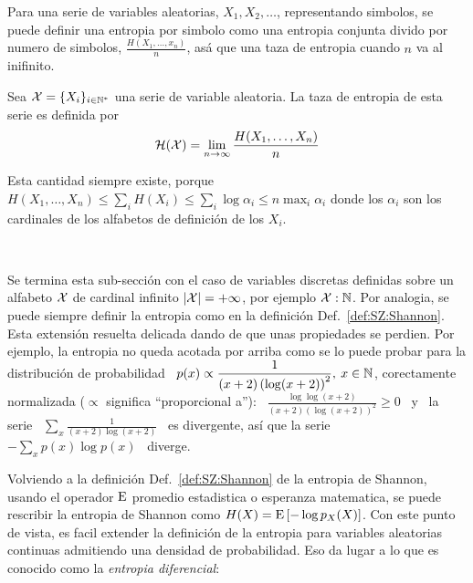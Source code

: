 Para  una  serie de  variables  aleatorias,  $X_1,  X_2, \ldots$,  representando
simbolos, se puede  definir una entropia por simbolo  como una entropia conjunta
divido por numero de simbolos, $\frac{H(X_1,\ldots,x_n)}{n}$, as\'a que una taza
de entropia cuando $n$ va al inifinito.
%
\begin{definicion}\label{def:SZ:TazaDeEntropia}
  Sea $\mathcal{X} = \{  X_i \}_{i \in \mathbb{N}^*}$ una  serie de variable aleatoria.  La taza de
  entropia de esta serie es definida por
  \[
  \mathcal{H}(\mathcal{X}) = \lim_{n \to \infty} \frac{H(X_1,\ldots,X_n)}{n}
  \]
\end{definicion}
%
\noindent Esta cantidad siempre existe, porque $H(X_1 , \ldots , X_n) \le \sum_i
H(X_i) \le \sum_i \log \alpha_i \le  n \max_i \alpha_i$ donde los $\alpha_i$ son
los cardinales de los alfabetos de definici\'on de los $X_i$.

\

Se termina esta sub-secci\'on con el caso de variables discretas definidas sobre
un  alfabeto $\mathcal{X}$ de  cardinal infinito  $|\mathcal{X}| =  + \infty$,  por ejemplo  $\mathcal{X} :
\mathbb{N}$.   Por  analogia,  se  puede  siempre  definir la  entropia  como  en  la
definici\'on Def.~\ref{def:SZ:Shannon}. Esta extensi\'on resuelta delicada dando
de que unas  propiedades se perdien.  Por ejemplo, la  entropia no queda acotada
por arriba  como se  lo puede  probar para la  distribuci\'on de  probabilidad \
$\displaystyle p(x)  \propto \frac{1}{(x+2) \left(  \log (x+2) \right)^2},  \: x
\in \mathbb{N}$, corectamente normalizada ($\propto$ significa ``proporcional a''): \
$\displaystyle \frac{\log \log(x+2)}{(x+2) \left( \log (x+2) \right)^2} \ge 0$ \
y  \  la  serie  \  $\displaystyle  \sum_x  \frac{1}{(x+2)  \log  (x+2)}$  \  es
divergente,  as\'i que  la serie  \ $\displaystyle  - \sum_x  p(x) \log  p(x)$ \
diverge.


\label{sec:SZ:Diferencial}

Volviendo a la definici\'on Def.~\ref{def:SZ:Shannon} de la entropia de Shannon,
usando el operador $\operatorname{E}$ promedio  estadistica o esperanza matematica, se puede
rescribir la entropia de Shannon como $H(X) = \operatorname{E}\left[ - \log p_X(X) \right]$.
Con este punto  de vista, es facil extender la definici\'on  de la entropia para
variables aleatorias continuas admitiendo  una densidad de probabilidad.  Eso da
lugar a lo que es conocido como la {\it entropia diferencial}:

